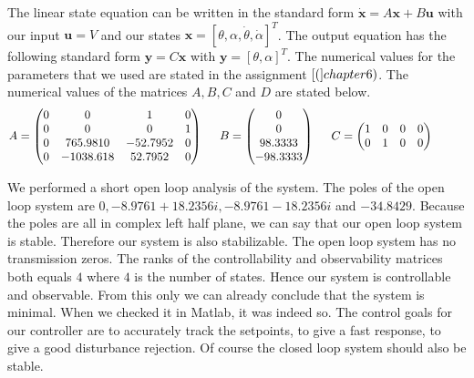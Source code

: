 \documentclass[ twoside,openright,titlepage,numbers=noenddot,headinclude,%
                footinclude=true,cleardoublepage=empty,abstractoff, %
                BCOR=5mm,paper=a4,fontsize=11pt,%
                ngerman,american,%
                ]{scrreprt}
\begin{document}
The linear state equation can be written in the standard form $\mathbf{\dot{x}} = A \mathbf{x} + B \mathbf{u}$ with our input $\mathbf{u} = V$ and our states $\mathbf{x} = [\theta, \alpha ,\dot{\theta}, \dot{\alpha}]^T$. The output equation has the following standard form $\mathbf{y} = C \mathbf{x}$ with $\mathbf{y} = [\theta, \alpha]^T$. The numerical values for the parameters that we used are stated in the assignment $\cite[assignment](chapter 6)$. The numerical values of the matrices $A,B,C$ and $D$ are stated below.
\begin{equation}
A = 
\begin{pmatrix}
  0 & 0 & 1 & 0 \\
  0 & 0 & 0 & 1 \\
  0  & 765.9810  & -52.7952 & 0 \\
  0 & -1038.618 & 52.7952 & 0
\end{pmatrix} \hspace{0.5cm}
B = 
\begin{pmatrix}
  0 \\
  0 \\
  98.3333 \\
  -98.3333
\end{pmatrix} \hspace{0.5cm}
C = 
\begin{pmatrix}
  1 & 0 & 0 & 0 \\
  0 & 1 & 0 & 0 
\end{pmatrix} \hspace{1cm}
\end{equation}

We performed a short open loop analysis of the system. The poles of the open loop system are $0,-8.9761+18.2356i,-8.9761-18.2356i$ and $-34.8429$. Because the poles are all in complex left half plane, we can say that our open loop system is stable. Therefore our system is also stabilizable. The open loop system has no transmission zeros. The ranks of the controllability and observability matrices both equals $4$ where $4$ is the number of states. Hence our system is controllable and observable. From this only we can already conclude that the system is minimal. When we checked it in Matlab, it was indeed so. 
\newline
\newline
The control goals for our controller are to accurately track the setpoints, to give a fast response, to give a good disturbance rejection. Of course the closed loop system should also be stable.
\end{document}
